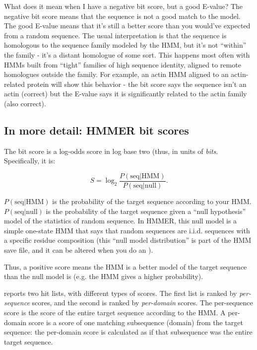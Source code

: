 \begin{srefaq}{What does it mean when I have a negative bit score,
but a good E-value?} The negative bit score means that the sequence is
not a good match to the model. The good E-value means that it's still
a better score than you would've expected from a random sequence. The
usual interpretation is that the sequence is homologous to the
sequence family modeled by the HMM, but it's not ``within'' the family
- it's a distant homologue of some sort. This happens most often with
HMMs built from ``tight'' families of high sequence identity, aligned
to remote homologues outside the family. For example, an actin HMM
aligned to an actin-related protein will show this behavior - the bit
score says the sequence isn't an actin (correct) but the E-value says
it is significantly related to the actin family (also correct).
\end{srefaq}

\subsection{In more detail: HMMER bit scores}

The bit score is a log-odds score in log base two (thus, in units of
{\em bits}. Specifically, it is:

\[
	S = \log_2 \frac {P( \mbox{seq} | \mbox{HMM})} { P (\mbox{seq} |
	\mbox{null})}.
\]

$P( \mbox{seq} | \mbox{HMM})$ is the probability of the target
sequence according to your HMM. $ P (\mbox{seq} | \mbox{null}) $ is
the probability of the target sequence given a ``null hypothesis''
model of the statistics of random sequence. In HMMER, this null model
is a simple one-state HMM that says that random sequences are i.i.d.
sequences with a specific residue composition (this ``null model
distribution'' is part of the HMM save file, and it can be altered
when you do an ).

Thus, a positive score means the HMM is a better model of the target
sequence than the null model is (e.g. the HMM gives a higher
probability).

 reports two hit lists, with different types of
scores. The first list is ranked by {\em per-sequence} scores, and the
second is ranked by {\em per-domain} scores. The per-sequence score is
the score of the entire target sequence according to the HMM. A
per-domain score is a score of one matching subsequence (domain) from
the target sequence: the per-domain score is calculated as if that
subsequence was the entire target sequence.


